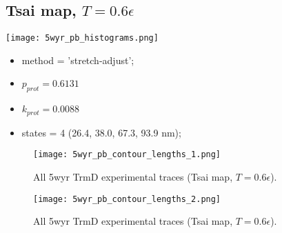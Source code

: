 \subsection{Tsai map, $T=0.6\epsilon$}
\label{subsec:5wyr-pb}
\begin{minipage}[c]{0.7\textwidth}
    \texttt{[image: 5wyr\_pb\_histograms.png]}
\end{minipage}
\hfill
\begin{minipage}[c]{0.45\textwidth}
    \begin{itemize}
        \item method = 'stretch-adjust';
        \item $p_{prot}=0.6131$
        \item $k_{prot}=0.0088$
        \item states = 4 (26.4, 38.0, 67.3, 93.9 nm);
    \end{itemize}
\end{minipage}

\begin{figure}
    \centering
    \texttt{[image: 5wyr\_pb\_contour\_lengths\_1.png]}
    \caption{All 5wyr TrmD experimental traces (Tsai map, $T=0.6\epsilon$).}
    \label{fig:5wyr-pb-cl1}
\end{figure}

\begin{figure}
    \centering
    \texttt{[image: 5wyr\_pb\_contour\_lengths\_2.png]}
    \caption{All 5wyr TrmD experimental traces (Tsai map, $T=0.6\epsilon$).}
    \label{fig:5wyr-pb-cl2}
\end{figure}


